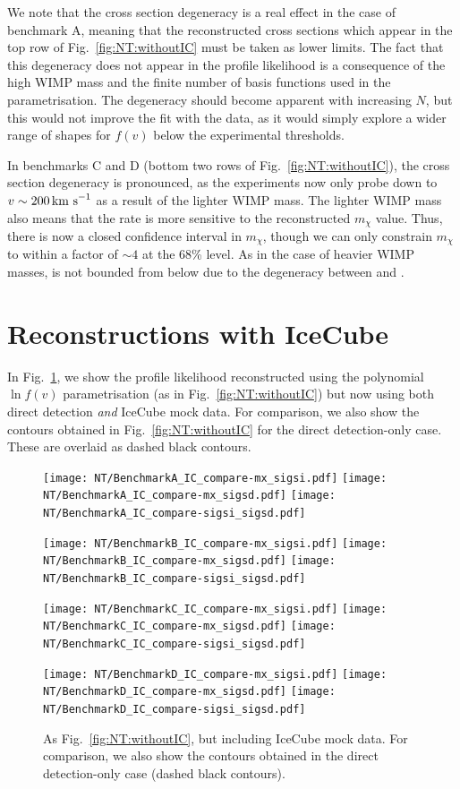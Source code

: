 We note that the cross section degeneracy is a real effect in the case of benchmark A, meaning that the reconstructed cross sections which appear in the top row of Fig.~\ref{fig:NT:withoutIC} must be taken as lower limits. The fact that this degeneracy does not appear in the profile likelihood is a consequence of the high WIMP mass and the finite number of basis functions used in the parametrisation. The degeneracy should become apparent with increasing $N$, but this would not improve the fit with the data, as it would simply explore a wider range of shapes for $f(v)$ below the experimental thresholds.

In benchmarks C and D (bottom two rows of Fig.~\ref{fig:NT:withoutIC}), the cross section degeneracy is pronounced, as the experiments now only probe down to $v\sim 200 \,\textrm{km s}^{-1}$ as a result of the lighter WIMP mass. The lighter WIMP mass also means that the rate is more sensitive to the reconstructed $m_\chi$ value. Thus, there is now a closed confidence interval in $m_\chi$, though we can only constrain $m_\chi$ to within a factor of $\sim 4$ at the 68\% level. As in the case of heavier WIMP masses, \sigmapsd is not bounded from below due to the degeneracy between \sigmapsi and \sigmapsd.

\section{Reconstructions with IceCube}
\label{sec:NT:withIC}
In Fig.~\ref{fig:NT:withIC}, we show the profile likelihood reconstructed using the polynomial $\ln f(v)$ parametrisation (as in Fig.~\ref{fig:NT:withoutIC}) but now using both direct detection \textit{and} IceCube mock data. For comparison, we also show the contours obtained in Fig.~\ref{fig:NT:withoutIC} for the direct detection-only case. These are overlaid as dashed black contours.


\begin{figure}[p!]
  \centering
  \texttt{[image: NT/BenchmarkA\_IC\_compare-mx\_sigsi.pdf]}
  \texttt{[image: NT/BenchmarkA\_IC\_compare-mx\_sigsd.pdf]}
  \texttt{[image: NT/BenchmarkA\_IC\_compare-sigsi\_sigsd.pdf]}

  \texttt{[image: NT/BenchmarkB\_IC\_compare-mx\_sigsi.pdf]}
  \texttt{[image: NT/BenchmarkB\_IC\_compare-mx\_sigsd.pdf]}
  \texttt{[image: NT/BenchmarkB\_IC\_compare-sigsi\_sigsd.pdf]}

  \texttt{[image: NT/BenchmarkC\_IC\_compare-mx\_sigsi.pdf]}
  \texttt{[image: NT/BenchmarkC\_IC\_compare-mx\_sigsd.pdf]}
  \texttt{[image: NT/BenchmarkC\_IC\_compare-sigsi\_sigsd.pdf]}

  \texttt{[image: NT/BenchmarkD\_IC\_compare-mx\_sigsi.pdf]}
  \texttt{[image: NT/BenchmarkD\_IC\_compare-mx\_sigsd.pdf]}
  \texttt{[image: NT/BenchmarkD\_IC\_compare-sigsi\_sigsd.pdf]}
\caption[As Fig.~\ref{fig:NT:withoutIC}, but including IceCube mock data]{As Fig.~\ref{fig:NT:withoutIC}, but including IceCube mock data. For comparison, we also show the contours obtained in the direct detection-only case (dashed black contours).}
\label{fig:NT:withIC}
\end{figure}

